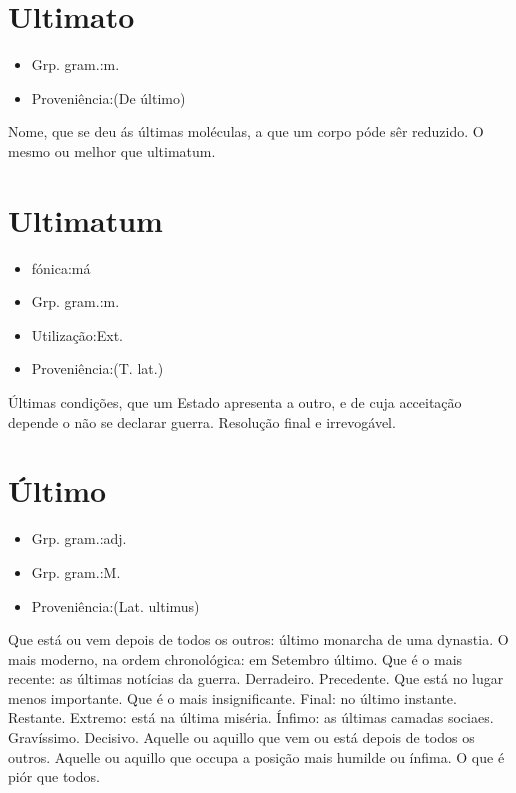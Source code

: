 \documentclass{article}
\begin{document}
\section{Ultimato}
\begin{itemize}
\item {Grp. gram.:m.}
\end{itemize}
\begin{itemize}
\item {Proveniência:(De \textunderscore último\textunderscore )}
\end{itemize}
Nome, que se deu ás últimas moléculas, a que um corpo póde sêr reduzido.
O mesmo ou melhor que \textunderscore ultimatum\textunderscore .
\section{Ultimatum}
\begin{itemize}
\item {fónica:má}
\end{itemize}
\begin{itemize}
\item {Grp. gram.:m.}
\end{itemize}
\begin{itemize}
\item {Utilização:Ext.}
\end{itemize}
\begin{itemize}
\item {Proveniência:(T. lat.)}
\end{itemize}
Últimas condições, que um Estado apresenta a outro, e de cuja acceitação depende o não se declarar guerra.
Resolução final e irrevogável.
\section{Último}
\begin{itemize}
\item {Grp. gram.:adj.}
\end{itemize}
\begin{itemize}
\item {Grp. gram.:M.}
\end{itemize}
\begin{itemize}
\item {Proveniência:(Lat. \textunderscore ultimus\textunderscore )}
\end{itemize}
Que está ou vem depois de todos os outros: \textunderscore último monarcha de uma dynastia\textunderscore .
O mais moderno, na ordem chronológica: \textunderscore em Setembro último\textunderscore .
Que é o mais recente: \textunderscore as últimas notícias da guerra\textunderscore .
Derradeiro.
Precedente.
Que está no lugar menos importante.
Que é o mais insignificante.
Final: \textunderscore no último instante\textunderscore .
Restante.
Extremo: \textunderscore está na última miséria\textunderscore .
Ínfimo: \textunderscore as últimas camadas sociaes\textunderscore .
Gravíssimo.
Decisivo.
Aquelle ou aquillo que vem ou está depois de todos os outros.
Aquelle ou aquillo que occupa a posição mais humilde ou ínfima.
O que é piór que todos.
\end{document}
